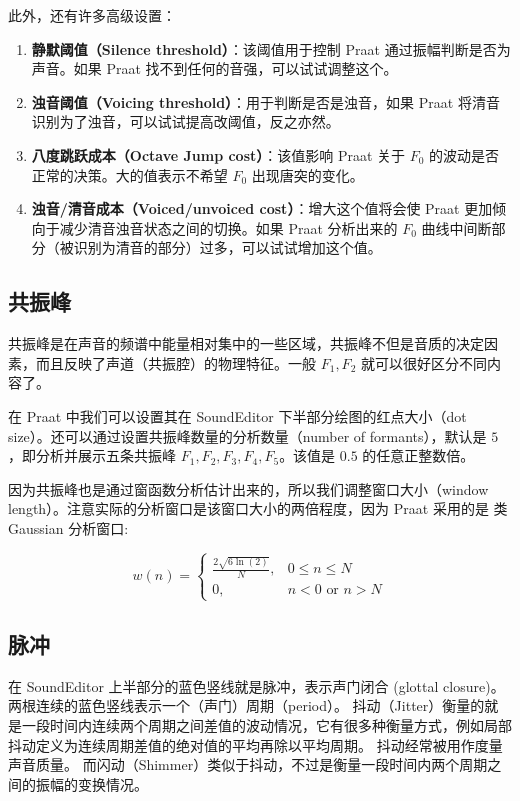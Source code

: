 此外，还有许多高级设置：
\begin{enumerate}
  \item \textbf{静默阈值（Silence threshold）}：该阈值用于控制 Praat 通过振幅判断是否为声音。如果 Praat 找不到任何的音强，可以试试调整这个。
  \item \textbf{浊音阈值（Voicing threshold）}：用于判断是否是浊音，如果 Praat 将清音识别为了浊音，可以试试提高改阈值，反之亦然。
  \item \textbf{八度跳跃成本（Octave Jump cost）}：该值影响 Praat 关于 $F_0$ 的波动是否正常的决策。大的值表示不希望 $F_0$ 出现唐突的变化。
  \item \textbf{浊音/清音成本（Voiced/unvoiced cost）}：增大这个值将会使 Praat 更加倾向于减少清音浊音状态之间的切换。如果 Praat 分析出来的 $F_0$ 曲线中间断部分（被识别为清音的部分）过多，可以试试增加这个值。
\end{enumerate}

\subsection{共振峰}
共振峰是在声音的频谱中能量相对集中的一些区域，共振峰不但是音质的决定因素，而且反映了声道（共振腔）的物理特征。一般 $F_1, F_2$ 就可以很好区分不同内容了。

在 Praat 中我们可以设置其在 SoundEditor 下半部分绘图的红点大小（dot size）。还可以通过设置共振峰数量的分析数量（number of formants），默认是 $5$，即分析并展示五条共振峰 $F_1, F_2, F_3, F_4, F_5$。该值是 $0.5$ 的任意正整数倍。

因为共振峰也是通过窗函数分析估计出来的，所以我们调整窗口大小（window length）。注意实际的分析窗口是该窗口大小的两倍程度，因为 Praat 采用的是 {\kaishu 类 Gaussian 分析窗口}:

\begin{equation}
  w(n) =
  \begin{cases}
    \frac{2 \sqrt{6 \ln(2)}}{N}, & 0 \le n \le N\\
    0, & n < 0 \text{ or } n > N
  \end{cases}
\end{equation}

\subsection{脉冲}
在 SoundEditor 上半部分的蓝色竖线就是脉冲，表示{\kaishu 声门闭合 (glottal closure)}。
两根连续的蓝色竖线表示一个（声门）周期（period）。
{\kaishu 抖动（Jitter）}衡量的就是一段时间内连续两个周期之间差值的波动情况，它有很多种衡量方式，例如局部抖动定义为连续周期差值的绝对值的平均再除以平均周期。
抖动经常被用作度量声音质量。
而闪动（Shimmer）类似于抖动，不过是衡量一段时间内两个周期之间的振幅的变换情况。


